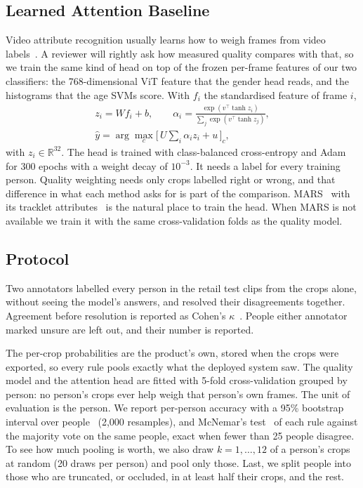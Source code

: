 \subsection{Learned Attention Baseline}
Video attribute recognition usually learns how to weigh frames from video
labels~\cite{chen2019temporal}. A reviewer will rightly ask how measured quality
compares with that, so we train the same kind of head on top of the frozen
per-frame features of our two classifiers: the 768-dimensional ViT feature that
the gender head reads, and the histograms that the age SVMs score. With $f_i$
the standardised feature of frame $i$,
\begin{gather}
z_i = W f_i + b, \qquad
\alpha_i = \frac{\exp\left(v^{\top}\tanh z_i\right)}
                {\sum_j \exp\left(v^{\top}\tanh z_j\right)}, \\
\hat{y} = \arg\max_c \Big[\, U \sum\nolimits_i \alpha_i z_i + u \,\Big]_c,
\end{gather}
with $z_i \in \mathbb{R}^{32}$. The head is trained with class-balanced
cross-entropy and Adam for 300 epochs with a weight decay of $10^{-3}$. It
needs a label for every training person. Quality weighting needs only crops
labelled right or wrong, and that difference in what each method asks for is
part of the comparison. MARS~\cite{zheng2016mars} with its tracklet
attributes~\cite{chen2019temporal} is the natural place to train the head. When
MARS is not available we train it with the same cross-validation folds as the
quality model.

\subsection{Protocol}
Two annotators labelled every person in the retail test clips from the crops
alone, without seeing the model's answers, and resolved their disagreements
together. Agreement before resolution is reported as Cohen's
$\kappa$~\cite{cohen1960kappa}. People either annotator marked unsure are left
out, and their number is reported.

The per-crop probabilities are the product's own, stored when the crops were
exported, so every rule pools exactly what the deployed system saw. The quality
model and the attention head are fitted with 5-fold cross-validation grouped by
person: no person's crops ever help weigh that person's own frames. The unit of
evaluation is the person. We report per-person accuracy with a 95\% bootstrap
interval over people~\cite{efron1993bootstrap} (2,000 resamples), and McNemar's
test~\cite{mcnemar1947} of each rule against the majority vote on the same
people, exact when fewer than 25 people disagree. To see how much pooling is
worth, we also draw $k = 1, \dots, 12$ of a person's crops at random (20 draws
per person) and pool only those. Last, we split people into those who are
truncated, or occluded, in at least half their crops, and the rest.


